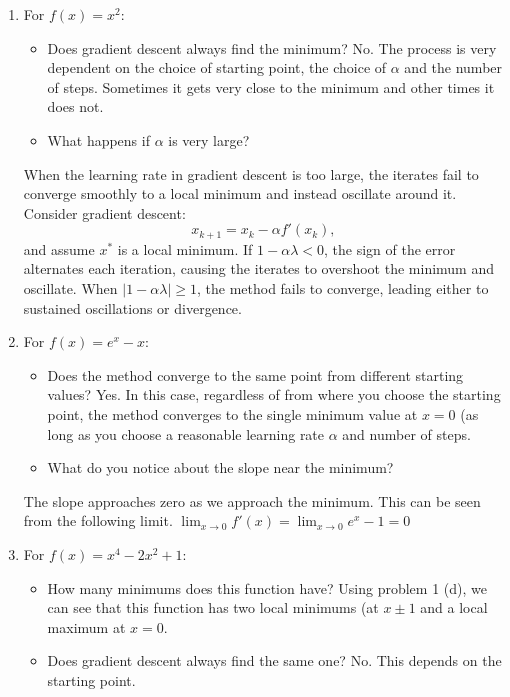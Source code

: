 \documentclass[11pt]{article}
\begin{document}
\begin{enumerate}

    \item For $f(x) = x^2$:
    \begin{itemize}
        \item Does gradient descent always find the minimum?
         {\color{blue}
         No. The process is very dependent on the choice of starting point, the choice of $\alpha$ and the number of steps. Sometimes it gets very close to the minimum and other times it does not.
         }
        
        \item What happens if $\alpha$ is very large?
    \end{itemize}
  {\color{blue}
        When the learning rate in gradient descent is too large, the iterates fail to converge smoothly to a local minimum and instead oscillate around it. 
Consider gradient descent:
\[
x_{k+1} = x_k - \alpha f'(x_k),
\]
and assume \(x^*\) is a local minimum. 
If \(1 - \alpha \lambda < 0\), the sign of the error alternates each iteration, causing the iterates to overshoot the minimum and oscillate. When \(|1 - \alpha \lambda| \ge 1\), the method fails to converge, leading either to sustained oscillations or divergence.
    }

    \item For $f(x) = e^x - x$:
    \begin{itemize}
        \item Does the method converge to the same point from different starting values?
        {\color{blue} Yes. In this case, regardless of from where you choose the starting point, the  method converges to the single minimum value at $x = 0$ (as long as you choose a reasonable learning rate $\alpha$ and number of steps.}
        
        \item What do you notice about the slope near the minimum?
    \end{itemize}
    {\color{blue} The slope approaches zero as we approach the minimum. This can be seen from the following limit. $\displaystyle \lim_{x \to 0}f'(x) = \displaystyle \lim_{x \to 0}e^x - 1 = 0$}
    \item For $f(x) = x^4 - 2x^2 + 1$:
    \begin{itemize}
        \item How many minimums does this function have?
    {\color{blue} Using problem 1 (d), we can see that this function has two local minimums (at $x \pm 1$ and a local maximum at $x = 0$.
    }        
        \item Does gradient descent always find the same one?
         {\color{blue}
         No. This depends on the starting point.}
        

\end{itemize}
\end{enumerate}
\end{document}
